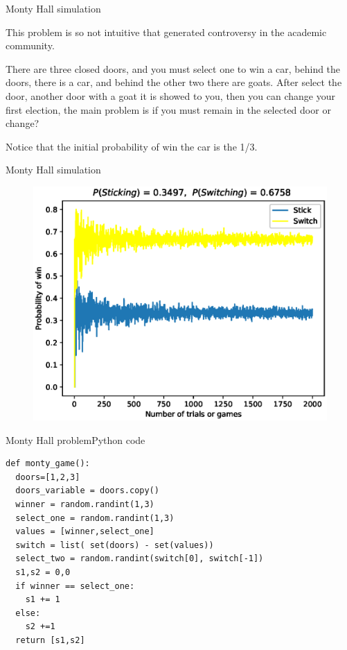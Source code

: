 \documentclass{beamer}
\begin{document}
\begin{frame}{Monty Hall simulation}
\begin{block}

This problem is so not intuitive that generated controversy in the academic community. 
\end{block}

There are three closed doors,  and you must select one to win  a car,  behind the doors, there is a car, and behind the other two there are goats. After select the door, another door with a goat it is showed to you, then you can change your first election,  the main problem is if you must remain in the selected door or change?

Notice that the initial probability of win the car is the 1/3.
\end{frame}



\begin{frame}{Monty Hall simulation}{}
\begin{figure}[htbp]
\centerline{\includegraphics[scale=0.66]{./graphs/Monty.eps}}
\end{figure}
\end{frame}





\begin{frame}[fragile]{Monty Hall problem}{Python code}
\begin{lstlisting}
def monty_game():
  doors=[1,2,3]
  doors_variable = doors.copy()
  winner = random.randint(1,3)
  select_one = random.randint(1,3)
  values = [winner,select_one]
  switch = list( set(doors) - set(values))
  select_two = random.randint(switch[0], switch[-1])
  s1,s2 = 0,0
  if winner == select_one:
    s1 += 1
  else:
    s2 +=1
  return [s1,s2]
\end{lstlisting}
\end{frame}
\end{document}
